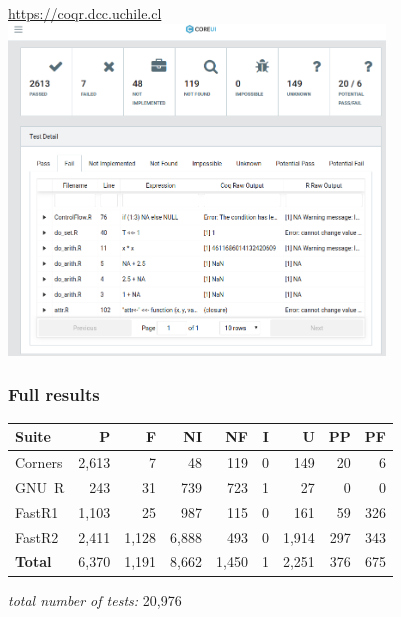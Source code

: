 \documentclass{beamer}
\begin{document}
\frame{\questiontoc}

\begin{frame}
    \label{frame:fails}
    \begin{center}
        \vspace{-2mm}
        \href{https://coqr.dcc.uchile.cl/\#/test-detail/148}{\url{https://coqr.dcc.uchile.cl}}
        \vspace{2mm}
        \includegraphics[width=10cm]{images/fail.png}
    \end{center}
\end{frame}

\frame{\questiontoc}

\begin{frame}
    \label{frame:full:results}
    \frametitle{Full results}

\begin{tabular}{|l||r|r|r|r|r|r|r|r|}
\hline
{\bf Suite}  & {\bf P} & {\bf F} & {\bf NI} & {\bf NF} & {\bf I} & {\bf U} & {\bf PP} & {\bf PF} \\ \hline\hline
Corners     & 2,613 & 7     & 48     &   119    & 0   & 149    &   20  & 6 \\ \hline
GNU~R       & 243   & 31    & 739    &   723    & 1   & 27     &   0   & 0 \\ \hline
FastR1      & 1,103 & 25    & 987    &   115    & 0   & 161    &   59  & 326 \\ \hline
FastR2      & 2,411 & 1,128 & 6,888  &   493    & 0   & 1,914  &   297 & 343 \\ \hline\hline
{\bf Total} & 6,370 & 1,191 & 8,662  &   1,450  &  1  & 2,251  &   376 & 675 \\
\hline
\end{tabular}

{\em total number of tests:} 20,976

\end{frame}

\frame{\questiontoc}

\frame{\tableofcontents}
\end{document}
